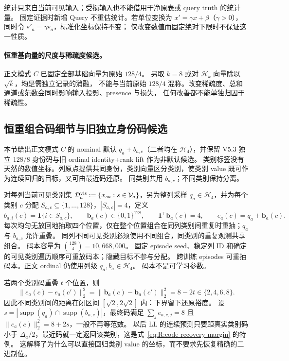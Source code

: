 \documentclass[11pt,UTF8,fontset=fandol]{ctexart}
\numberwithin{equation}{section}
\theoremstyle{definition}
\newcommand{\Vset}{\mathcal V}
\begin{document}
统计只来自当前可见输入；受损输入也不能借用干净原表或 query truth 的统计量。
固定证据时新增 Query 不重估统计。若单位变换为 $x'=\gamma x+\beta$（$\gamma>0$），
同时令 $\varepsilon'_a=\gamma\varepsilon_a$，标准化坐标保持不变；
仅改变数值而固定绝对下限时不保证这一性质。



\paragraph{恒重基向量的尺度与稀疏度候选。}\label{v53c:sparse-bases}
正文模式 $C$ 已固定全部基础向量为原始 $128/4$。
另取 $k=8$ 或对 $\mathcal H_k$ 向量除以 $\sqrt{k}$，均是需独立记录的消融，
不能与当前原始 $128/4$ 混称。改变稀疏度、总和通道或范数会同时影响输入投影、presence 与损失，
任何改善都不能单独归因于稀疏性。

\subsection{恒重组合码细节与旧独立身份码候选}\label{v53c:constant-weight-option}

本节给出正文模式 $C$ 的 nominal 默认 $q_a+b_{a,c}$（二者均在 $\mathcal H_4$），并保留 V5.3 独立 $128/8$ 身份码与旧 ordinal identity+rank lift 作为非默认候选。
类别标签没有天然的数值坐标。列原点提供共同身份，类别向量区分类别，使类别 value 既可作为连续回归的目标，又可由最近码还原。
同类别共用 $b_{a,c}$；不同类别保持分离。

对每列当前可见类别集
$\mathcal D_a^{\rm vis}:=\{x_{sa}:s\in\Vset_a\}$，另为整列采样 $q_a\in\mathcal H_4$，并为每个类别 $c$ 分配
$S_{a,c}\subseteq\{1,\ldots,128\}$，$|S_{a,c}|=4$，定义
\begin{equation}
 b_{a,i}(c)=\mathbf1\{i\in S_{a,c}\},\qquad
 \bm b_a(c)\in\{0,1\}^{128},\qquad \bm1^\top\bm b_a(c)=4,
 \qquad e_a(c)=q_a+\bm b_a(c).
 \label{eq:E:constant-weight-code}
\end{equation}
每次均匀无放回地抽取四个位置，仅在整个位置组合在同列类别间重复时重抽；$q_a$ 与 $b_{a,c}$ 允许重叠。
同列不同可见类别必须使用不同组合，同类别的重复观测共享组合。
码本容量为 $\binom{128}{4}=10{,}668{,}000$。
固定 episode seed、稳定列 ID 和确定的可见类别遍历顺序可重放码本；隐藏目标不参与分配。
跨训练 episodes 可重抽码本。正文 ordinal 仍使用列级 $q_a,b_a\in\mathcal H_4$。
码本不是可学习参数。

若两个类别码重叠 $t$ 个位置，则
\begin{equation}
 \|e_a(c)-e_a(c')\|_2^2=\|\bm b_a(c)-\bm b_a(c')\|_2^2=8-2t\in\{2,4,6,8\}.
 \label{eq:E:code-geometry}
\end{equation}
因此不同类别间的距离在闭区间 $[\sqrt2,2\sqrt2]$ 内：下界留下还原裕度。
设 $s=|\operatorname{supp}(q_a)\cap\operatorname{supp}(b_{a,c})|$，最终码满足 $\sum_j e_{a,c,j}=8$ 且 $\|e_a(c)\|_2^2=8+2s$，一般不再等范数。
以后 LL 的连续预测只要距真实类别码小于 $\Delta_a/2$，最近码就一定返回该类别，这是式~\eqref{eq:R:code-recovery-margin} 的特例。
这解释了为什么可以直接回归类别 value 的坐标，而不要求先恢复精确的二进制位。
\end{document}
